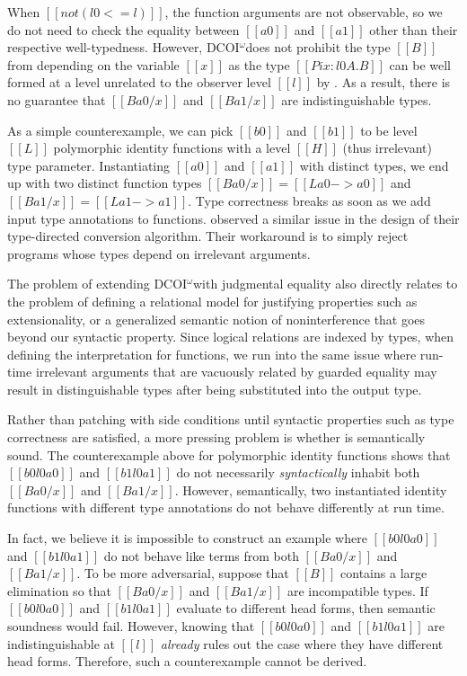 \documentclass[acmsmall]{acmart}
\makeatletter
\theoremstyle{linked}
\theoremstyle{deflinked}
\theoremstyle{acmdefinition}
\newcommand{\name}{\texorpdfstring{DCOI$^{\omega}$\@\xspace}{DCOI-omega}}
\makeatother
\begin{document}
When $[[not (l0 <= l)]]$, the function
arguments are not observable, so we do not need to check the
equality between $[[a0]]$ and $[[a1]]$ other than their respective
well-typedness. However, \name does not prohibit the type $[[B]]$ from
depending on the variable $[[x]]$ as the type $[[Pi x : l0 A . B]]$
can be well formed at a level unrelated to the observer level $[[l]]$
by .
As a result, there is no guarantee that $[[B {a0 / x}]]$ and $[[B {a1
  / x}]]$ are indistinguishable types.

As a simple counterexample, we can pick $[[b0]]$ and $[[b1]]$ to be
level $[[L]]$ polymorphic identity functions with a level $[[H]]$
(thus irrelevant)
type parameter. Instantiating $[[a0]]$ and $[[a1]]$ with distinct
types, we end up with two distinct function types $[[B {a0 / x}]] = [[L
a0 -> a0]]$ and $[[B {a1 / x}]] = [[L a1 -> a1]]$. Type correctness
breaks as soon as we add input type annotations to
functions. \citet{abel:irrelevance} observed a similar issue in the
design of their type-directed conversion algorithm. Their workaround is
to simply reject programs whose types depend on irrelevant arguments.

The problem of extending \name with judgmental equality also
directly relates to the problem of defining a relational model for justifying properties
such as extensionality, or a generalized semantic notion of noninterference
that goes beyond our syntactic  property.
Since logical relations are indexed by types,
when defining the interpretation for functions, we run into the same
issue where run-time irrelevant arguments that are vacuously related by guarded
equality may result in distinguishable types after being substituted
into the output type.

Rather than patching  with side conditions until
syntactic properties such as type correctness are satisfied, a more
pressing problem is whether  is semantically sound.
The counterexample above for polymorphic identity functions
shows that $[[b0 l0 a0]]$ and $[[b1 l0 a1]]$ do not necessarily
\emph{syntactically} inhabit both $[[B {a0 / x}]]$ and $[[B {a1 / x}]]$. However,
semantically, two instantiated identity functions with different type
annotations do not behave differently at run time.

In fact, we believe it is impossible to construct an
example where $[[b0 l0 a0]]$ and $[[b1 l0 a1]]$ do not behave
like terms from both $[[B {a0 / x}]]$ and $[[B {a1 / x}]]$.
To be more adversarial, suppose that $[[B]]$ contains a large elimination so that $[[B
{a0 /x}]]$ and $[[B {a1 / x}]]$ are incompatible types. If $[[b0 l0
a0]]$ and $[[b1 l0 a1]]$ evaluate to different head forms, then
semantic soundness would fail. However, knowing that $[[b0 l0 a0]]$ and
$[[b1 l0 a1]]$ are indistinguishable at $[[l]]$ \emph{already} rules out the
case where they have different head forms. Therefore, such a counterexample
cannot be derived.
\end{document}

